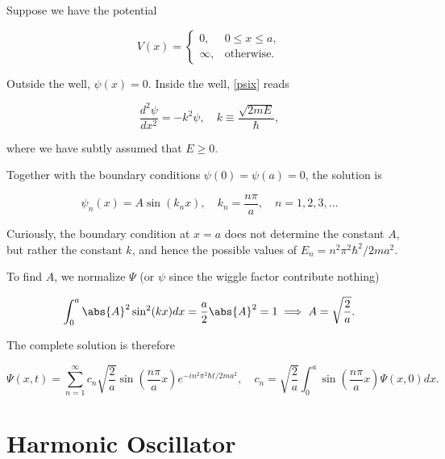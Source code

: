 \documentclass[a4paper,12pt]{report}
\begin{document}
Suppose we have the potential 

\begin{equation}
  V(x) =
  \begin{cases} 
  0, & 0 \leq x \leq a, \\
  \infty, & \text{otherwise}.
  \end{cases}
\end{equation}

Outside the well, \(\psi (x) = 0\). Inside the well, \cref{psix} reads 

\begin{equation}
  \frac{d^2\psi }{dx^2} = -k^2\psi , \quad  k \equiv \frac{\sqrt{2mE} }{\hbar }, \label{free} 
\end{equation}

where we have subtly assumed that \(E \ge 0\).  

Together with the boundary conditions \(\psi (0) = \psi (a) = 0\), the solution is  

\begin{equation}
  \psi _{n} (x) = A\sin (k_{n} x), \quad k_{n} = \frac{n\pi }{a}, \quad n = 1,2,3,\ldots 
\end{equation}

Curiously, the boundary condition at \(x = a\) does not determine the constant \(A\), but rather the constant \(k\), and hence the possible values of \( E_{n} = n^2\pi ^2\hbar ^2 /2ma^2\).

To find \(A\), we normalize \(\Psi \) (or \(\psi \) since the wiggle factor contribute nothing) 

\begin{equation}
  \int_{0}^{a} \abs{A}^2 \sin ^2(kx) dx = \frac{a}{2} \abs{A}^2  = 1 \implies A = \sqrt{\frac{2}{a} }.      
\end{equation}

The complete solution is therefore

\begin{equation}
  \Psi (x,t) = \sum_{n=1}^{\infty} c_{n} \sqrt{\frac{2}{a} } \sin \left( \frac{n\pi }{a}x  \right) e^{-i n^2\pi ^2\hbar t /2ma^2}, \quad c_{n} = \sqrt{\frac{2}{a} } \int_{0}^{a} \sin \left( \frac{n\pi }{a}x  \right)\Psi (x,0)dx.    
\end{equation}



\section{Harmonic Oscillator}
\end{document}
